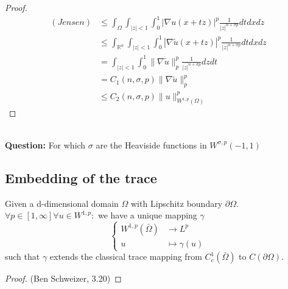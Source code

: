 \begin{proof}
\begin{align*}
  (Jensen)&\leq  \int_\Omega \int_{|z| < 1} \int_0^1 |\nabla u(x + tz)|^p 
  			\frac{1}{|z|^{n + \sigma p}} dt dx dz\\
  		& \leq \int_{\mathbb{R}^n} \int_{|z| < 1} \int_0^1 |\nabla \tilde{u}(x + tz)|^p 
  			\frac{1}{|z|^{n + \sigma p}} dt dx dz \\
  		& = \int_{|z| < 1} \int_0^1 \|\nabla \tilde{u}\|_p^p \frac{1}{|z|^{n + \sigma p}} dz dt \\
  		& = C_1(n, \sigma, p) \|\nabla \tilde{u}\|^p_p\\
  		& \leq C_2(n, \sigma, p) \|u\|_{W^{1,p}(\Omega)}^p
  	\end{align*}
\end{proof}
$\quad$\\
\textbf{Question:}
For which $\sigma$ are the Heaviside functions in $W^{\sigma, p}(-1, 1)$


\subsection{Embedding of the trace}
\begin{theorem}
	Given a d-dimensional domain $\Omega$ with Lipschitz boundary $\partial \Omega$. $\forall p \in [1, \infty] \forall u \in W^{1, p}:$ we have a unique mapping $\gamma$
	\begin{equation*}
	\left\{
	\begin{aligned}
		W^{1, p}(\bar{\Omega}) &\rightarrow L^p\\
		u &\mapsto \gamma(u) 
	\end{aligned}
	\right.	
	\end{equation*}
	such that $\gamma$ extends the classical trace mapping from $C^1_c(\bar{\Omega})$ to $C(\partial\Omega)$.
\end{theorem}
\begin{proof}(Ben Schweizer, 3.20)
	
\end{proof}


